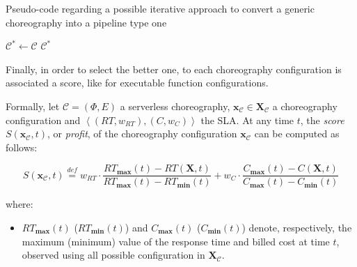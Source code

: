 \documentclass[12pt,a4paper]{report}
\newcommand{\mathDef}{\overset{\textit{def}}{=}}
\begin{document}
\begin{algorithm}\caption{Pseudo-code regarding a possible iterative approach to convert a generic choreography into a pipeline type one}\label{naiveIter}
	
	$\mathcal{C}^* \leftarrow \mathcal{C}$\;
	\Return $\mathcal{C}^*$
\end{algorithm}

Finally, in order to select the better one, to each choreography configuration is associated a score, like for executable function configurations. 

Formally, let $\mathcal{C} = (\Phi,E)$ a serverless choreography, $\textbf{x}_{\mathcal{C}} \in \textbf{X}_{\mathcal{C}}$ a choreography configuration and $\left\langle (RT,w_{RT}),(C,w_{C}) \right\rangle$ the SLA. At any time $t$, the \textit{score} $S(\textbf{x}_{\mathcal{C}},t)$, or \textit{profit}, of the choreography configuration $\textbf{x}_{\mathcal{C}}$ can be computed as follows:

\begin{equation}
	S(\textbf{x}_{\mathcal{C}},t) \mathDef w_{RT} \cdot \dfrac{RT_{\textbf{max}}(t) - RT(\textbf{X},t)}{RT_{\textbf{max}}(t) - RT_{\textbf{min}}(t)} + w_{C} \cdot \dfrac{C_{\textbf{max}}(t) - C(\textbf{X},t)}{C_{\textbf{max}}(t) - C_{\textbf{min}}(t)}
\end{equation}

where:

\begin{itemize}
	\item $RT_{\textbf{max}}(t)$ ($RT_{\textbf{min}}(t)$) and $C_{\textbf{max}}(t)$ ($C_{\textbf{min}}(t)$) denote, respectively, the maximum (minimum) value of the response time and billed cost at time $t$, observed using all possible configuration in $\textbf{X}_{\mathcal{C}}$.
\end{itemize}
\end{document}

